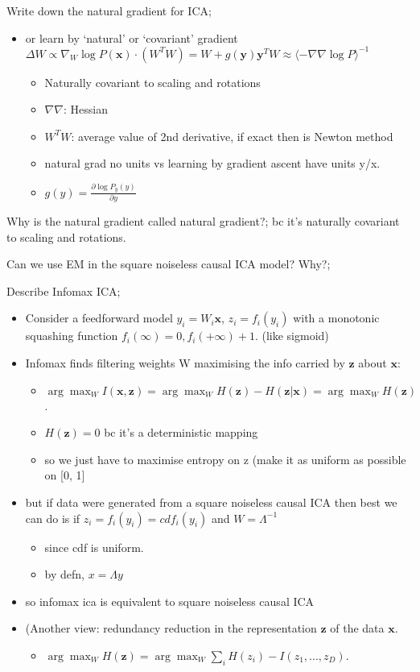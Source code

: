\documentclass{article}
\begin{document}
Write down the natural gradient for ICA; \begin{itemize} \item or learn by `natural' or `covariant' gradient $\Delta W\propto \nabla_W\log P(\mathbf{x})\cdot (W^TW) = W + g(\mathbf{y})\mathbf{y}^TW \approx \langle -\nabla\nabla\log P\rangle^{-1}$ \begin{itemize} \item Naturally covariant to scaling and rotations \item $\nabla\nabla$: Hessian \item $W^TW$: average value of 2nd derivative, if exact then is Newton method \item natural grad no units vs learning by gradient ascent have units y/x. \item $g(y)=\frac{\partial \log P_y(y)}{\partial y}$ \end{itemize} \end{itemize}

Why is the natural gradient called natural gradient?; bc it's naturally covariant to scaling and rotations.


Can we use EM in the square noiseless causal ICA model? Why?; 

Describe Infomax ICA; \begin{itemize} \item Consider a feedforward model $y_i=W_i\mathbf{x}$, $z_i=f_i(y_i)$ with a monotonic squashing function $f_i(\infty)=0, f_i(+\infty)+1$. (like sigmoid) \item Infomax finds filtering weights W maximising the info carried by $\mathbf{z}$ about $\mathbf{x}$: \begin{itemize} \item $\arg\max_W I(\mathbf{x, z}) = \arg\max_W H(\mathbf{z})-H(\mathbf{z|x})=\arg\max_WH(\mathbf{z})$. \item $H(\mathbf{z})=0$ bc it's a deterministic mapping \item so we just have to maximise entropy on z (make it as uniform as possible on [0, 1] \end{itemize} \item but if data were generated from a square noiseless causal ICA then best we can do is if $z_i=f_i(y_i)=cdf_i(y_i)$ and $W=\Lambda^{-1}$ \begin{itemize} \item since cdf is uniform. \item by defn, $x=\Lambda y$ \end{itemize} \item so infomax ica is equivalent to square noiseless causal ICA \item (Another view: redundancy reduction in the representation $\mathbf{z}$ of the data $\mathbf{x}$. \begin{itemize} \item $\arg\max_W H(\mathbf{z})=\arg\max_W\sum_i H(z_i)-I(z_1,...,z_D)$. \end{itemize} \end{itemize}
\end{document}
